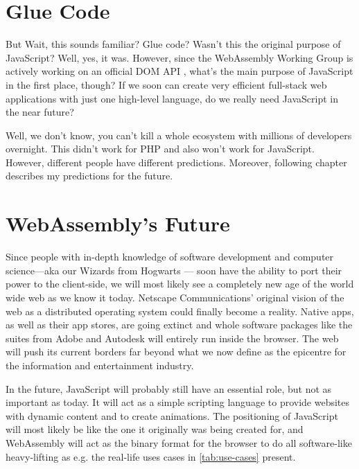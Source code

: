 \documentclass[10pt]{article}
\begin{document}
\begin{sloppypar}
  \section{Glue Code}
  \label{sec:glue-code}

  But Wait, this sounds familiar? Glue code? Wasn’t this the original purpose of JavaScript? Well, yes, it was. However, since the WebAssembly Working Group is actively working on an official DOM API \citep{mozilla_webassemblymodule_2023}, what’s the main purpose of JavaScript in the first place, though? If we soon can create very efficient full-stack web applications with just one high-level language, do we really need JavaScript in the near future?

  Well, we don’t know, you can’t kill a whole ecosystem with millions of developers overnight. This didn’t work for PHP and also won’t work for JavaScript. However, different people have different predictions. Moreover, following chapter describes my predictions for the future.

  \section{WebAssembly's Future}
  \label{sec:webassembly-future}

  Since people with in-depth knowledge of software development and computer science—aka our Wizards from Hogwarts — soon have the ability to port their power to the client-side, we will most likely see a completely new age of the world wide web as we know it today. Netscape Communications’ original vision of the web as a distributed operating system could finally become a reality. Native apps, as well as their app stores, are going extinct and whole software packages like the suites from Adobe and Autodesk will entirely run inside the browser. The web will push its current borders far beyond what we now define as the epicentre for the information and entertainment industry.

  In the future, JavaScript will probably still have an essential role, but not as important as today. It will act as a simple scripting language to provide websites with dynamic content and to create animations. The positioning of JavaScript will most likely be like the one it originally was being created for, and WebAssembly will act as the binary format for the browser to do all software-like heavy-lifting as e.g. the real-life uses cases in \autoref{tab:use-cases} present.



\end{sloppypar}
\end{document}
